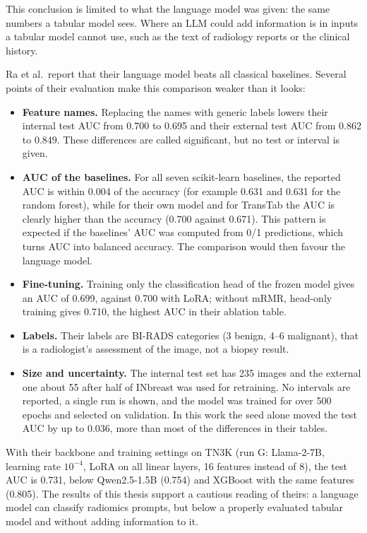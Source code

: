 This conclusion is limited to what the language model was given: the same numbers a tabular model
sees. Where an LLM could add information is in inputs a tabular model cannot use, such as the
text of radiology reports or the clinical history.

Ra et al.\ report that their language model beats all classical baselines. Several points of their
evaluation make this comparison weaker than it looks:

\begin{itemize}
  \item \textbf{Feature names.} Replacing the names with generic labels lowers their internal test
        AUC from 0.700 to 0.695 and their external test AUC from 0.862 to 0.849. These differences
        are called significant, but no test or interval is given.
  \item \textbf{AUC of the baselines.} For all seven scikit-learn baselines, the reported AUC is
        within 0.004 of the accuracy (for example 0.631 and 0.631 for the random forest), while
        for their own model and for TransTab the AUC is clearly higher than the accuracy (0.700
        against 0.671). This pattern is expected if the baselines' AUC was computed from 0/1
        predictions, which turns AUC into balanced accuracy. The comparison would then favour the
        language model.
  \item \textbf{Fine-tuning.} Training only the classification head of the frozen model gives an
        AUC of 0.699, against 0.700 with LoRA; without mRMR, head-only training gives 0.710, the
        highest AUC in their ablation table.
  \item \textbf{Labels.} Their labels are BI-RADS categories (3 benign, 4--6 malignant), that is a
        radiologist's assessment of the image, not a biopsy result.
  \item \textbf{Size and uncertainty.} The internal test set has 235 images and the external one
        about 55 after half of INbreast was used for retraining. No intervals are reported, a
        single run is shown, and the model was trained for over 500 epochs and selected on
        validation. In this work the seed alone moved the test AUC by up to 0.036, more than most
        of the differences in their tables.
\end{itemize}

With their backbone and training settings on TN3K (run G: Llama-2-7B, learning rate $10^{-4}$,
LoRA on all linear layers, 16 features instead of 8), the test AUC is 0.731, below Qwen2.5-1.5B
(0.754) and XGBoost with the same features (0.805). The results of this thesis support a cautious
reading of theirs: a language model can classify radiomics prompts, but below a properly evaluated
tabular model and without adding information to it.

